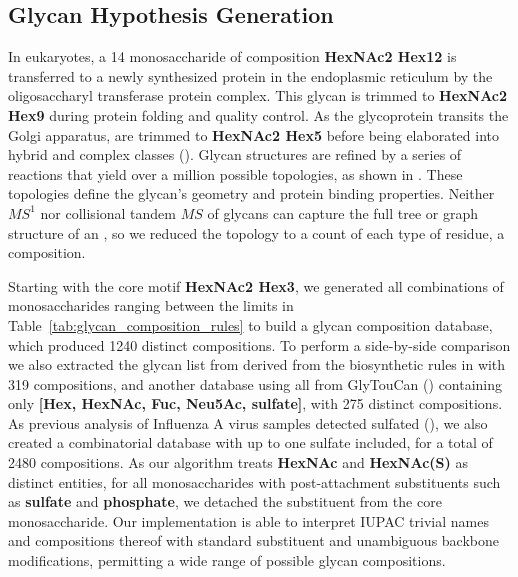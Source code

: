 \subsection{Glycan Hypothesis Generation}

    In eukaryotes, a 14 monosaccharide \nglycan of composition \textbf{HexNAc2 Hex12} is
    transferred to a newly synthesized protein in the endoplasmic reticulum by
    the oligosaccharyl transferase protein complex.  This glycan is trimmed to
    \textbf{HexNAc2 Hex9} during protein folding and quality control.  As the glycoprotein
    transits the Golgi apparatus, \nglycans are trimmed to \textbf{HexNAc2 Hex5} before
    being elaborated into hybrid and complex \nglycan classes (\cite{Stanley2009}).
    Glycan structures are refined by a series of reactions that yield over a million
    possible \nglycan topologies, as shown in \cite{Akune2016}. These topologies define
    the glycan's geometry and protein binding properties. Neither $MS^1$ nor collisional
    tandem $MS$ of glycans can capture the full tree or graph structure of an \nglycan,
    so we reduced the topology to a count of each type of residue, a composition.

    Starting with the core motif \textbf{HexNAc2 Hex3}, we generated all combinations of
    monosaccharides ranging between the limits in Table~\ref{tab:glycan_composition_rules}
    to build a glycan composition database, which produced 1240 distinct compositions. To
    perform a side-by-side comparison we also extracted the glycan list from \cite{Yu2013}
    derived from the biosynthetic rules in \cite{Krambeck2005} with 319 compositions, and
    another database using all \nglycans from GlyTouCan (\cite{Tiemeyer2017}) containing only
    \textbf{[Hex, HexNAc, Fuc, Neu5Ac, sulfate]}, with 275 distinct compositions. As previous
    analysis of Influenza A virus samples detected sulfated \nglycans (\cite{Khatri2016a}),
    we also created a combinatorial database with up to one sulfate included, for a total
    of 2480 compositions. As our algorithm treats \textbf{HexNAc} and \textbf{HexNAc(S)}
    as distinct entities, for all monosaccharides with post-attachment substituents such
    as \textbf{sulfate} and \textbf{phosphate}, we detached the substituent from the core
    monosaccharide. Our implementation is able to interpret IUPAC trivial names and compositions
    thereof with standard substituent and unambiguous backbone modifications, permitting a
    wide range of possible glycan compositions.


